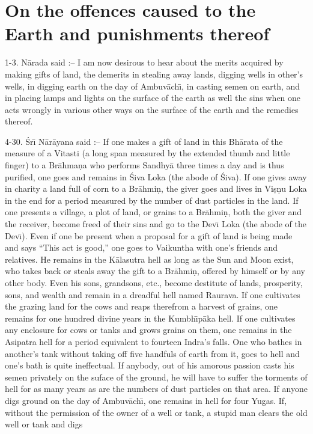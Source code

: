 \chapter{On the offences caused to the Earth and punishments thereof}

1-3. N\=arada said :-- I am now desirous to hear about the merits acquired by making gifts of land, the demerits in stealing away lands, digging wells in other's wells, in digging earth on the day of Ambuv\=ach\={\i}, in casting semen on earth, and in placing lamps and lights on the surface of the earth as well the sins when one acts wrongly in various other ways on the surface of the earth and the remedies thereof.

4-30. \'Sr\={\i} N\=ar\=ayana said :-- If one makes a gift of land in this Bh\=arata of the measure of a Vitasti (a long span measured by the extended thumb and little finger) to a Br\=ahma\d{n}a who performs Sandhy\=a three times a day and is thus purified, one goes and remains in \'Siva Loka (the abode of \'Siva). If one gives away in charity a land full of corn to a Br\=ahmi\d{n}, the giver goes and lives in Vi\d{s}\d{n}u Loka in the end for a period measured by the number of dust particles in the land. If one presents a village, a plot of land, or grains to a Br\=ahmi\d{n}, both the giver and the receiver, become freed of their sins and go to the Dev\={\i} Loka (the abode of the Dev\={\i}). Even if one be present when a proposal for a gift of land is being made and says ``This act is good,'' one goes to Vaikuntha with one's friends and relatives. He remains in the K\=alasutra hell as long as the Sun and Moon exist, who takes back or steals away the gift to a Br\=ahmi\d{n}, offered by himself or by any other body. Even his sons, grandsons, etc., become destitute of lands, prosperity, sons, and wealth and remain in a dreadful hell named Raurava. If one cultivates the grazing land for the cows and reaps therefrom a harvest of grains, one remains for one hundred divine years in the Kumbh\={\i}p\=aka hell. If one cultivates any enclosure for cows or tanks and grows grains on them, one remains in the Asipatra hell for a period equivalent to fourteen Indra's falls. One who bathes in another's tank without taking off five handfuls of earth from it, goes to hell and one's bath is quite ineffectual. If anybody, out of his amorous passion casts his semen privately on the suface of the ground, he will have to suffer the torments of hell for as many years as are the numbers of dust particles on that area. If anyone digs ground on the day of Ambuv\=ach\={\i}, one remains in hell for four Yugas. If, without the permission of the owner of a well or tank, a stupid man clears the old well or tank and digs

